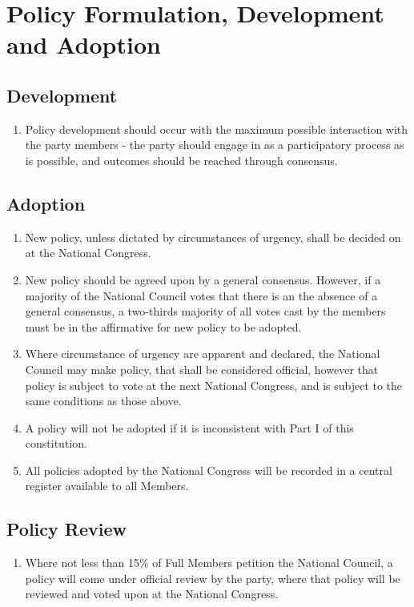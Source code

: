 \documentclass[a4paper,titlepage,8.5pt]{article}
\begin{document}
\section{Policy Formulation, Development and Adoption}

\subsection{Development}

\begin{enumerate}
\item Policy development should occur with the maximum possible interaction with the party members - the party should engage in as a participatory process as is possible, and outcomes should be reached through consensus.
\end{enumerate}

\subsection{Adoption}

\begin{enumerate}
\item New policy, unless dictated by circumstances of urgency, shall be decided on at the National Congress.
\item New policy should be agreed upon by a general consensus. However, if a majority of the National Council votes that there is an the absence of a general consensus, a two-thirds majority of all votes cast by the members must be in the affirmative for new policy to be adopted. 
\item Where circumstance of urgency are apparent and declared, the National Council may make policy, that shall be considered official, however that policy is subject to vote at the next National Congress, and is subject to the same conditions as those above. 
\item A policy will not be adopted if it is inconsistent with Part I of this constitution.
\item All policies adopted by the National Congress will be recorded in a central register available to all Members.
\end{enumerate}

\subsection{Policy Review}

\begin{enumerate}
\item Where not less than 15\% of Full Members petition the National Council, a policy will come under official review by the party, where that policy will be reviewed and voted upon at the National Congress.
\end{enumerate}
\end{document}
